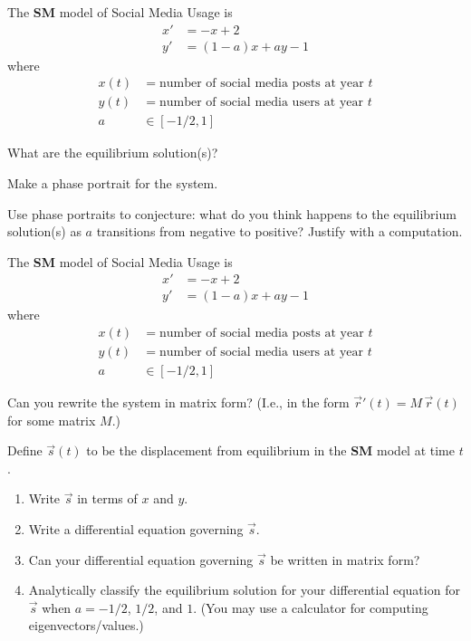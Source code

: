 \documentclass{workbook}
\begin{document}
\begin{slide}
	\question
	The \textbf{SM} model of Social Media Usage is
	\begin{align*}
		x'&=-x+2\\
		y'&=(1-a)x + ay - 1
	\end{align*}
	where
	\begin{align*}
		x(t) &= \text{number of social media posts at year $t$}\\
		y(t) &= \text{number of social media users at year $t$}\\
		a &\in [-1/2, 1]
	\end{align*}

	\begin{parts}
		\item What are the equilibrium solution(s)?
		\item Make a phase portrait for the system.
		\item Use phase portraits to conjecture: what do you think happens to the equilibrium
			solution(s) as $a$ transitions from negative to positive? Justify with a computation.
	\end{parts}
\end{slide}

\begin{slide}
	\question
	The \textbf{SM} model of Social Media Usage is
	\begin{align*}
		x'&=-x+2\\
		y'&=(1-a)x + ay - 1
	\end{align*}
	where
	\begin{align*}
		x(t) &= \text{number of social media posts at year $t$}\\
		y(t) &= \text{number of social media users at year $t$}\\
		a &\in [-1/2, 1]
	\end{align*}

	\begin{parts}
		\item Can you rewrite the system in matrix form? (I.e., in the form $\vec r'(t) = M\, \vec r(t)$ for some matrix $M$.)
		\item Define $\vec s(t)$  to be the displacement from equilibrium in the \textbf{SM} model at time $t$.
		\begin{enumerate}
			\item Write $\vec s$ in terms of $x$ and $y$.
			\item Write a differential equation governing $\vec s$.
			\item Can your differential equation governing $\vec s$ be written in matrix form?
			\item Analytically classify the equilibrium solution for your differential equation for $\vec s$
				when $a=-1/2$, $1/2$, and $1$. (You may use a calculator for computing eigenvectors/values.)
		\end{enumerate}
	\end{parts}
\end{slide}
\end{document}
